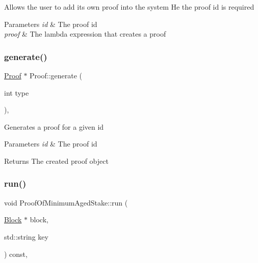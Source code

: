 Allows the user to add its own proof into the system He the proof id is required


\begin{DoxyParams}{Parameters}
{\em id} & The proof id \\
\hline
{\em proof} & The lambda expression that creates a proof \\
\hline
\end{DoxyParams}
\mbox{\label{classProof_a267f0f4587babb59884b5f280e2d54c8}} 
\subsubsection{\texorpdfstring{generate()}{generate()}}
{\footnotesize\ttfamily \mbox{\hyperlink{classProof}{Proof}} $\ast$ Proof\+::generate (\begin{DoxyParamCaption}\item[{int}]{type }\end{DoxyParamCaption})\hspace{0.3cm}{\ttfamily [static]}, {\ttfamily [inherited]}}

Generates a proof for a given id


\begin{DoxyParams}{Parameters}
{\em id} & The proof id \\
\hline
\end{DoxyParams}
\begin{DoxyReturn}{Returns}
The created proof object 
\end{DoxyReturn}
\mbox{\label{classProofOfMinimumAgedStake_aab3c754b7bc7c1c1e2ccebdaa764249b}} 
\subsubsection{\texorpdfstring{run()}{run()}}
{\footnotesize\ttfamily void Proof\+Of\+Minimum\+Aged\+Stake\+::run (\begin{DoxyParamCaption}\item[{\mbox{\hyperlink{classBlock}{Block}} $\ast$}]{block,  }\item[{std\+::string}]{key }\end{DoxyParamCaption}) const\hspace{0.3cm}{\ttfamily [override]}, {\ttfamily [virtual]}}

